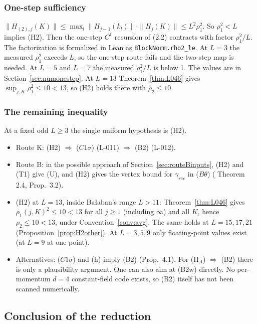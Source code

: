 \subsubsection{One-step sufficiency}\label{sec:onestep}
$\|H_{(2),j}(K)\|\le\max_l\|H_{j-1}(k_l)\|\cdot\|H_j(K)\|\le L^2\rho_1^2$. So $\rho_1^2<L$ implies (H2). Then the one-step $C^1$ recursion of  (2.2) contracts with factor $\rho_1^2/L$. The factorization is formalized in Lean as \texttt{BlockNorm.rho2\_le}.
At $L=3$ the measured $\rho_1^2$ exceeds $L$, so the one-step route fails and the two-step map is needed. At $L=5$ and $L=7$ the measured $\rho_1^2/L$ is below 1. The values are in Section~\ref{sec:numonestep}. At $L=13$ Theorem~\ref{thm:L046} gives $\sup_{j,K}\rho_1^2\le10<13$, so (H2) holds there with $\rho_2\le10$.

\subsubsection{The remaining inequality}\label{sec:remainingineq}
At a fixed odd $L\ge3$ the single uniform hypothesis is (H2).
\begin{itemize}
\item Route K: (H2) $\Rightarrow$ ($C1\sigma$) (L-011) $\Rightarrow$ (B2) (L-012).
\item Route B: in the possible approach of Section~\ref{sec:routeBinputs}, (H2) and (T1) give (U), and (H2) gives the vertex bound for $\gamma_{rec}$ in ($B\theta$) ( Theorem 2.4, Prop.\ 3.2).
\item (H2) at $L=13$, inside Ba{\l}aban's range $L>11$: Theorem~\ref{thm:L046} gives $\rho_1(j,K)^2\le10<13$ for all $j\ge1$ (including $\infty$) and all $K$, hence $\rho_2\le10<13$, under Convention~\ref{conv:avg}. The same holds at $L=15,17,21$ (Proposition~\ref{prop:H2other}). At $L=3,5,9$ only floating-point values exist (at $L=9$ at one point).
\item Alternatives: ($C1\sigma$) and (h) imply (B2) (Prop.\ 4.1). For (H$_A$) $\Rightarrow$ (B2) there is only a plausibility argument. One can also aim at (B2w) directly. No per-momentum $d=4$ constant-field code exists, so (B2) itself has not been scanned numerically.
\end{itemize}

\subsection{Conclusion of the reduction}\label{sec:conclusion}

